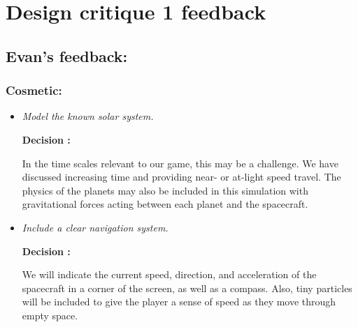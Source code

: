 \section{Design critique 1 feedback}

\subsection{Evan's feedback:}
\subsubsection{Cosmetic:}
\begin{itemize}

  \item \emph{Model the known solar system.}
        
        \textbf{Decision : } \parbox[t]{5in}{In the time scales relevant to our game, this may be a challenge.  We have discussed increasing time and providing near- or at-light speed travel.  The physics of the planets may also be included in this simulation with gravitational forces acting between each planet and the spacecraft.}

  \item \emph{Include a clear navigation system.}
        
        \textbf{Decision : } \parbox[t]{5in}{We will indicate the current speed, direction, and acceleration of the spacecraft in a corner of the screen, as well as a compass.  Also, tiny particles will be included to give the player a sense of speed as they move through empty space.}
\end{itemize}

